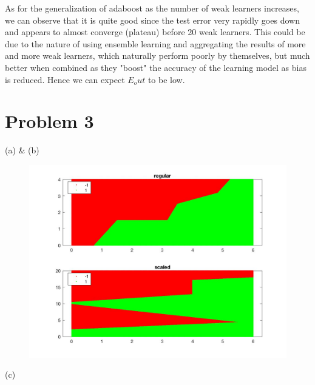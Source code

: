 \documentclass[12pt,letterpaper]{article}
\begin{document}
\begin{description}
As for the generalization of adaboost as the number of weak learners increases, we can observe that it is quite good since the test error very rapidly goes down and appears to almost converge (plateau) before 20 weak learners. This could be due to the nature of using ensemble learning and aggregating the results of more and more weak learners, which naturally perform poorly by themselves, but much better when combined as they "boost" the accuracy of the learning model as bias is reduced. Hence we can expect $E_out$ to be low.

\end{description}

\section*{Problem 3}
\begin{description}
	\item (a) \& (b)
\begin{figure}[H]
\includegraphics[scale=0.4]{image3.jpg} 
\end{figure}
	\item (c) 

\end{description}
\end{document}
